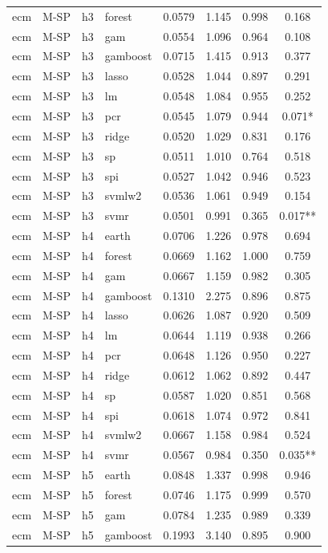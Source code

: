 \begin{ThreePartTable}
\begin{longtable}[t]{llclcccc}
ecm & M-SP & h3 & forest & 0.0579 & 1.145 & 0.998 & 0.168\\
ecm & M-SP & h3 & gam & 0.0554 & 1.096 & 0.964 & 0.108\\
ecm & M-SP & h3 & gamboost & 0.0715 & 1.415 & 0.913 & 0.377\\
ecm & M-SP & h3 & lasso & 0.0528 & 1.044 & 0.897 & 0.291\\
ecm & M-SP & h3 & lm & 0.0548 & 1.084 & 0.955 & 0.252\\
ecm & M-SP & h3 & pcr & 0.0545 & 1.079 & 0.944 & 0.071*\\
ecm & M-SP & h3 & ridge & 0.0520 & 1.029 & 0.831 & 0.176\\
ecm & M-SP & h3 & sp & 0.0511 & 1.010 & 0.764 & 0.518\\
ecm & M-SP & h3 & spi & 0.0527 & 1.042 & 0.946 & 0.523\\
ecm & M-SP & h3 & svmlw2 & 0.0536 & 1.061 & 0.949 & 0.154\\
ecm & M-SP & h3 & svmr & 0.0501 & 0.991 & 0.365 & 0.017**\\
\addlinespace
ecm & M-SP & h4 & earth & 0.0706 & 1.226 & 0.978 & 0.694\\
ecm & M-SP & h4 & forest & 0.0669 & 1.162 & 1.000 & 0.759\\
ecm & M-SP & h4 & gam & 0.0667 & 1.159 & 0.982 & 0.305\\
ecm & M-SP & h4 & gamboost & 0.1310 & 2.275 & 0.896 & 0.875\\
ecm & M-SP & h4 & lasso & 0.0626 & 1.087 & 0.920 & 0.509\\
ecm & M-SP & h4 & lm & 0.0644 & 1.119 & 0.938 & 0.266\\
ecm & M-SP & h4 & pcr & 0.0648 & 1.126 & 0.950 & 0.227\\
ecm & M-SP & h4 & ridge & 0.0612 & 1.062 & 0.892 & 0.447\\
ecm & M-SP & h4 & sp & 0.0587 & 1.020 & 0.851 & 0.568\\
ecm & M-SP & h4 & spi & 0.0618 & 1.074 & 0.972 & 0.841\\
ecm & M-SP & h4 & svmlw2 & 0.0667 & 1.158 & 0.984 & 0.524\\
ecm & M-SP & h4 & svmr & 0.0567 & 0.984 & 0.350 & 0.035**\\
\addlinespace
ecm & M-SP & h5 & earth & 0.0848 & 1.337 & 0.998 & 0.946\\
ecm & M-SP & h5 & forest & 0.0746 & 1.175 & 0.999 & 0.570\\
ecm & M-SP & h5 & gam & 0.0784 & 1.235 & 0.989 & 0.339\\
ecm & M-SP & h5 & gamboost & 0.1993 & 3.140 & 0.895 & 0.900\\

\end{longtable}
\end{ThreePartTable}
